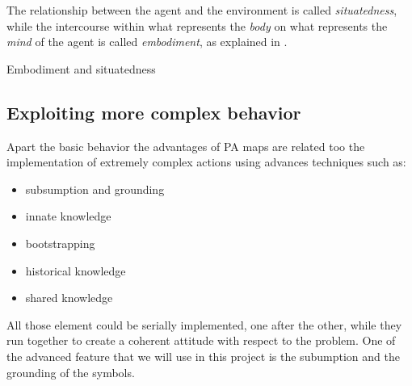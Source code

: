 The relationship between the agent and the environment is called \emph{situatedness}, while the intercourse within what represents the \emph{body} on what represents the \emph{mind} of the agent is called \emph{embodiment}, as explained in \citep{thedynamicsofactivecaterogicalperception}.
\begin{marginfigure}
\centering
{}
\caption{Embodiment and situatedness}
\end{marginfigure}

\subsection{Exploiting more complex behavior}
Apart the basic behavior the advantages of PA maps are related too the implementation of extremely complex actions using advances techniques such as:
\begin{itemize}
\item subsumption and grounding
\item innate knowledge
\item bootstrapping
\item historical knowledge
\item shared knowledge
\end{itemize}
All those element could be serially implemented, one after the other, while they run together to create a coherent attitude with respect to the problem. One of the advanced feature that we will use in this project is the subumption and the grounding of the symbols.

